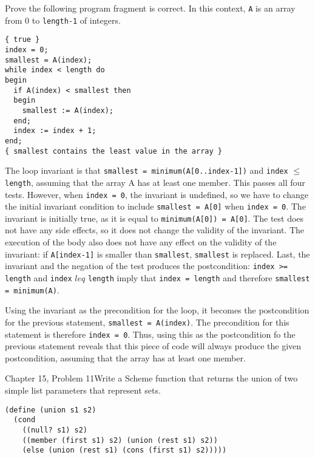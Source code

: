 \documentclass[11pt]{article}
\begin{document}
\begin{ps}
\begin{problemcit}{}Prove the following program fragment is correct. In this context, \verb|A| is an array from 0 to \verb|length-1| of integers.
\begin{verbatim}
{ true }
index = 0;
smallest = A(index);
while index < length do
begin
  if A(index) < smallest then
  begin
    smallest := A(index);
  end;
  index := index + 1;
end;
{ smallest contains the least value in the array }
\end{verbatim}
\end{problemcit}
\begin{soln}
The loop invariant is that \verb|smallest = minimum(A[0..index-1])| and \verb|index| $\leq$ \verb|length|, assuming that the array A has at least one member. This passes all four tests. However, when \verb|index = 0|, the invariant is undefined, so we have to change the initial invariant condition to include \verb|smallest = A[0]| when \verb|index = 0|. The invariant is initially true, as it is equal to \verb|minimum(A[0]) = A[0]|. The test does not have any side effects, so it does not change the validity of the invariant. The execution of the body also does not have any effect on the validity of the invariant: if \verb|A[index-1]| is smaller than \verb|smallest|, \verb|smallest| is replaced. Last, the invariant and the negation of the test produces the postcondition: \verb|index >= length| and \verb|index| $leq$ \verb|length| imply that \verb|index = length| and therefore \verb|smallest = minimum(A)|.

Using the invariant as the precondition for the loop, it becomes the postcondition for the previous statement, \verb|smallest = A(index)|. The precondition for this statement is therefore \verb|index = 0|. Thus, using this as the postcondition fo the previous statement reveals that this piece of code will always produce the given postcondition, assuming that the array has at least one member.
\end{soln}
\end{ps}

\begin{ps}
\begin{problemcit}{Chapter 15, Problem 11}Write a Scheme function that returns the union of two simple list parameters that represent sets.\end{problemcit}
\begin{soln}
\begin{verbatim}
(define (union s1 s2)
  (cond
    ((null? s1) s2)
    ((member (first s1) s2) (union (rest s1) s2))
    (else (union (rest s1) (cons (first s1) s2)))))
\end{verbatim}
\end{soln}
\end{ps}
\end{document}

